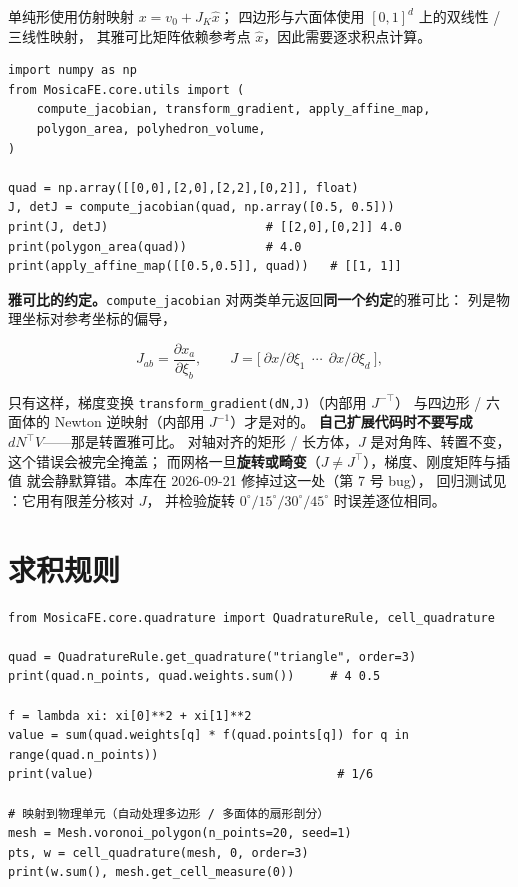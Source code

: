 \documentclass[UTF8,11pt,oneside]{ctexbook}
\theoremstyle{definition}
\theoremstyle{plain}
\newenvironment{caution}{%
  \begin{tcolorbox}[colback=orange!5,colframe=orange!55,title=注意,fonttitle=\bfseries]%
}{%
  \end{tcolorbox}%
}
\newcommand{\code}[1]{\texttt{#1}}
\begin{document}
单纯形使用仿射映射 $x=v_0+J_K\hat x$；
四边形与六面体使用 $[0,1]^d$ 上的双线性 / 三线性映射，
其雅可比矩阵依赖参考点 $\hat x$，因此需要逐求积点计算。

\begin{lstlisting}[language=MosicaFE,caption={示例 4.4：几何工具}]
import numpy as np
from MosicaFE.core.utils import (
    compute_jacobian, transform_gradient, apply_affine_map,
    polygon_area, polyhedron_volume,
)

quad = np.array([[0,0],[2,0],[2,2],[0,2]], float)
J, detJ = compute_jacobian(quad, np.array([0.5, 0.5]))
print(J, detJ)                      # [[2,0],[0,2]] 4.0
print(polygon_area(quad))           # 4.0
print(apply_affine_map([[0.5,0.5]], quad))   # [[1, 1]]
\end{lstlisting}

\begin{caution}
\textbf{雅可比的约定。}\code{compute\_\allowbreak jacobian} 对两类单元返回\textbf{同一个约定}的雅可比：
列是物理坐标对参考坐标的偏导，

\begin{equation}
J_{ab}=\frac{\partial x_a}{\partial\xi_b},
\qquad
J=\big[\ \partial x/\partial\xi_1\ \ \cdots\ \ \partial x/\partial\xi_d\ \big],
\label{eq:jac-convention}
\end{equation}

只有这样，梯度变换 \code{transform\_\allowbreak gradient(dN,\allowbreak  J)}（内部用 $J^{-\top}$）
与四边形 / 六面体的 Newton 逆映射（内部用 $J^{-1}$）才是对的。
\textbf{自己扩展代码时不要写成 $dN^{\top}V$}——那是转置雅可比。
对轴对齐的矩形 / 长方体，$J$ 是对角阵、转置不变，这个错误会被完全掩盖；
而网格一旦\textbf{旋转或畸变}（$J\ne J^{\top}$），梯度、刚度矩阵与插值
就会静默算错。本库在 2026-09-21 修掉过这一处（第 7 号 bug），
回归测试见 ：它用有限差分核对 $J$，
并检验旋转 $0^\circ/15^\circ/30^\circ/45^\circ$ 时误差逐位相同。
\end{caution}

\section{求积规则}

\begin{lstlisting}[language=MosicaFE,caption={示例 4.5：使用求积规则}]
from MosicaFE.core.quadrature import QuadratureRule, cell_quadrature

quad = QuadratureRule.get_quadrature("triangle", order=3)
print(quad.n_points, quad.weights.sum())     # 4 0.5

f = lambda xi: xi[0]**2 + xi[1]**2
value = sum(quad.weights[q] * f(quad.points[q]) for q in range(quad.n_points))
print(value)                                  # 1/6

# 映射到物理单元（自动处理多边形 / 多面体的扇形剖分）
mesh = Mesh.voronoi_polygon(n_points=20, seed=1)
pts, w = cell_quadrature(mesh, 0, order=3)
print(w.sum(), mesh.get_cell_measure(0))
\end{lstlisting}
\end{document}
